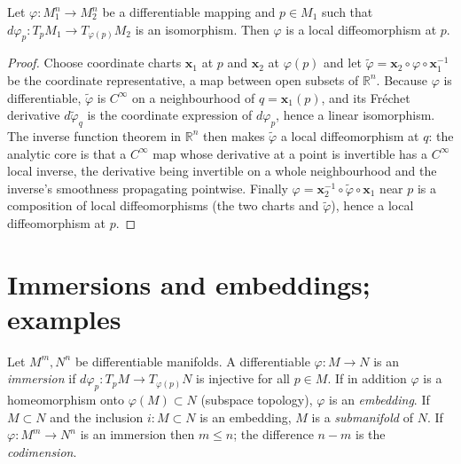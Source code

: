 \begin{theorem}
  \label{thm:dc-ch0-2-10}
  \leanok
  Let $\varphi:M_1^n\to M_2^n$ be a differentiable mapping and $p\in M_1$ such that
  $d\varphi_p:T_pM_1\to T_{\varphi(p)}M_2$ is an isomorphism. Then $\varphi$ is a
  local diffeomorphism at $p$.
\end{theorem}
\begin{proof}
  \leanok
  Choose coordinate charts $\mathbf{x}_1$ at $p$ and $\mathbf{x}_2$ at $\varphi(p)$
  and let $\tilde\varphi=\mathbf{x}_2\circ\varphi\circ\mathbf{x}_1^{-1}$ be the
  coordinate representative, a map between open subsets of $\mathbb{R}^n$. Because
  $\varphi$ is differentiable, $\tilde\varphi$ is $C^\infty$ on a neighbourhood of
  $q=\mathbf{x}_1(p)$, and its Fréchet derivative $d\tilde\varphi_q$ is the coordinate
  expression of $d\varphi_p$, hence a linear isomorphism. The inverse function theorem
  in $\mathbb{R}^n$ then makes $\tilde\varphi$ a local diffeomorphism at $q$: the
  analytic core is that a $C^\infty$ map whose derivative at a point is invertible has
  a $C^\infty$ local inverse, the derivative being invertible on a whole neighbourhood
  and the inverse's smoothness propagating pointwise. Finally $\varphi=\mathbf{x}_2^{-1}
  \circ\tilde\varphi\circ\mathbf{x}_1$ near $p$ is a composition of local
  diffeomorphisms (the two charts and $\tilde\varphi$), hence a local diffeomorphism
  at $p$.
\end{proof}

\section{Immersions and embeddings; examples}

\begin{definition}
  \label{def:dc-ch0-3-1}
  \leanok
  Let $M^m,N^n$ be differentiable manifolds. A differentiable $\varphi:M\to N$ is an
  \emph{immersion} if $d\varphi_p:T_pM\to T_{\varphi(p)}N$ is injective for all $p\in M$.
  If in addition $\varphi$ is a homeomorphism onto $\varphi(M)\subset N$ (subspace
  topology), $\varphi$ is an \emph{embedding}. If $M\subset N$ and the inclusion
  $i:M\subset N$ is an embedding, $M$ is a \emph{submanifold} of $N$. If $\varphi:M^m\to
  N^n$ is an immersion then $m\le n$; the difference $n-m$ is the \emph{codimension}.
\end{definition}

